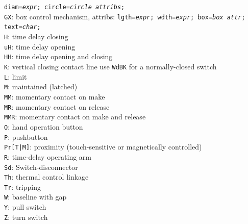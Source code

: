 {                                    {\tt diam={\sl expr};
                                         circle={\sl circle attribs};}\\
                                   {\tt GX}: box control mechanism, attribs:
                                    {\tt lgth={\sl expr}; wdth={\sl expr};
                                         box={\sl box attr};}
                                    {\tt text={\sl char};}\\
                                   {\tt H}: time delay closing\\
                                   {\tt uH}: time delay opening\\
                                   {\tt HH}: time delay opening and closing\\
                                   {\tt K}: vertical closing contact line
                                     use {\tt WdBK} for a normally-closed
                                     switch\\
                                   {\tt L}: limit\\
                                   {\tt M}: maintained (latched)\\
                                   {\tt MM}: momentary contact on make\\
                                   {\tt MR}: momentary contact on release\\
                                   {\tt MMR}: momentary contact on make and
                                     release\\
                                   {\tt O}: hand operation button\\
                                   {\tt P}: pushbutton\\
                                   {\tt Pr[T|M]}: proximity (touch-sensitive or
                                       magnetically controlled)\\
                                   {\tt R}: time-delay operating arm\\
                                   {\tt Sd}: Switch-disconnector\\
                                   {\tt Th}: thermal control linkage\\
                                   {\tt Tr}: tripping\\
                                   {\tt W}: baseline with gap\\
                                   {\tt Y}: pull switch\\
                                   {\tt Z}: turn switch
   }%
